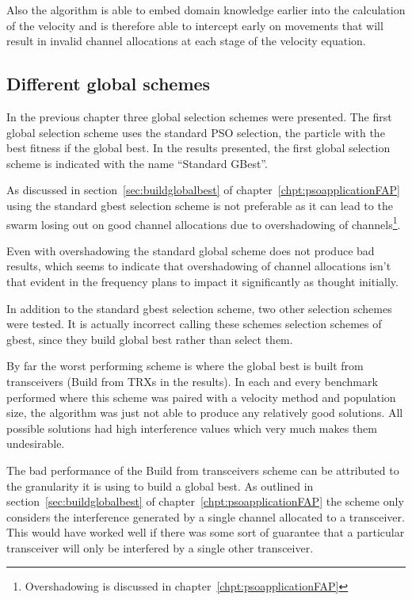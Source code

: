 Also the algorithm is able to embed domain knowledge earlier into the calculation of the velocity and is therefore able to intercept early on movements that will result in invalid channel allocations at each stage of the velocity equation.

\subsection{Different global schemes}
\label{sec:diffglobalschemes}
In the previous chapter three global selection schemes were presented. The first global selection scheme uses the standard PSO selection, the particle with the best fitness if the global best. In the results presented, the first global selection scheme is indicated with the name ``Standard GBest''.

As discussed in section~\ref{sec:buildglobalbest} of chapter~\ref{chpt:psoapplicationFAP} using the standard gbest selection scheme is not preferable as it can lead to the swarm losing out on good channel allocations due to overshadowing of channels\footnote{Overshadowing is discussed in chapter~\ref{chpt:psoapplicationFAP}}.

Even with overshadowing the standard global scheme does not produce bad results, which seems to indicate that overshadowing of channel allocations isn't that evident in the frequency plans to impact it significantly as thought initially.

In addition to the standard gbest selection scheme, two other selection schemes were tested. It is actually incorrect calling these schemes selection schemes of gbest, since they build global best rather than select them.

By far the worst performing scheme is where the global best is built from transceivers (Build from TRXs in the results). In each and every benchmark performed where this scheme was paired with a velocity method and population size, the algorithm was just not able to produce any relatively good solutions. All possible solutions had high interference values which very much makes them undesirable.

The bad performance of the Build from transceivers scheme can be attributed to the granularity it is using to build a global best. As outlined in section~\ref{sec:buildglobalbest} of chapter~\ref{chpt:psoapplicationFAP} the scheme only considers the interference generated by a single channel allocated to a transceiver. This would have worked well if there was some sort of guarantee that a particular transceiver will only be interfered by a single other transceiver.

